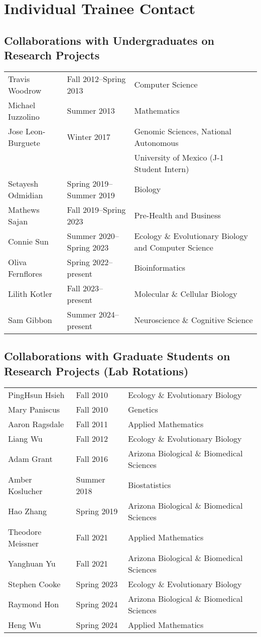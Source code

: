 \documentclass[11pt]{article}
\begin{document}
\section*{Individual Trainee Contact}

\subsection*{Collaborations with Undergraduates on Research Projects}
\begin{longtable}[l]{l l l}
Travis Woodrow & Fall 2012--Spring 2013 & Computer Science\\
Michael Iuzzolino & Summer 2013 & Mathematics\\
Jose Leon-Burguete & Winter 2017 & Genomic Sciences, National Autonomous\\ 
                   &             & University of Mexico (J-1 Student Intern)\\
Setayesh Odmidian & Spring 2019--Summer 2019 & Biology\\
Mathews Sajan & Fall 2019--Spring 2023 & Pre-Health and Business\\
Connie Sun & Summer 2020--Spring 2023 & Ecology \& Evolutionary Biology and Computer Science\\
Oliva Fernflores & Spring 2022--present & Bioinformatics\\
Lilith Kotler & Fall 2023--present & Molecular \& Cellular Biology\\
Sam Gibbon & Summer 2024--present & Neuroscience \& Cognitive Science\\
\end{longtable}

\subsection*{Collaborations with Graduate Students on Research Projects (Lab Rotations)}
\begin{longtable}[l]{l l l}
PingHsun Hsieh & Fall 2010 & Ecology \& Evolutionary Biology\\
Mary Paniscus & Fall 2010 & Genetics\\
Aaron Ragsdale & Fall 2011 & Applied Mathematics\\
Liang Wu & Fall 2012 & Ecology \& Evolutionary Biology\\
Adam Grant & Fall 2016 & Arizona Biological \& Biomedical Sciences\\
Amber Koslucher & Summer 2018 & Biostatistics\\
Hao Zhang & Spring 2019 & Arizona Biological \& Biomedical Sciences\\
Theodore Meissner & Fall 2021 & Applied Mathematics\\
Yanghuan Yu & Fall 2021 & Arizona Biological \& Biomedical Sciences\\
Stephen Cooke & Spring 2023 & Ecology \& Evolutionary Biology\\
Raymond Hon & Spring 2024 & Arizona Biological \& Biomedical Sciences\\
Heng Wu & Spring 2024 & Applied Mathematics\\
\end{longtable}
\end{document}
